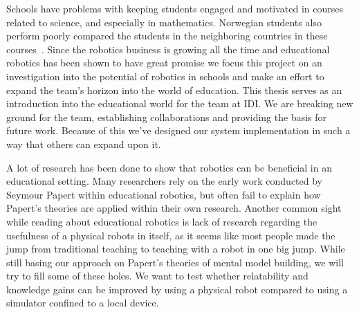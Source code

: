 Schools have problems with keeping students engaged and motivated in courses related to science, and especially in mathematics. 
Norwegian students also perform poorly compared the students in the neighboring countries in these courses~\cite{OECDPISA}.
Since the robotics business is growing all the time and educational robotics has been shown to have great promise we focus this project on an investigation into the potential of robotics in schools and make an effort to expand the \chirp team's horizon into the world of education. This thesis serves as an introduction into the educational world for the \chirp team at IDI. We are breaking new ground for the team, establishing collaborations and providing the basis for future work. 
Because of this we've designed our system implementation in such a way that others can expand upon it. 

\bigskip\noindent
A lot of research has been done to show that robotics can be beneficial in an educational setting.
Many researchers rely on the early work conducted by Seymour Papert within educational robotics, but often fail to explain how Papert's theories are applied within their own research. 
Another common sight while reading about educational robotics is lack of research regarding the usefulness of a physical robots in itself, as it seems like most people made the jump from traditional teaching to teaching with a robot in one big jump. 
While still basing our approach on Papert's theories of mental model building, we will try to fill some of these holes. We want to test whether relatability and knowledge gains can be improved by using a physical robot compared to using a simulator confined to a local device. 


